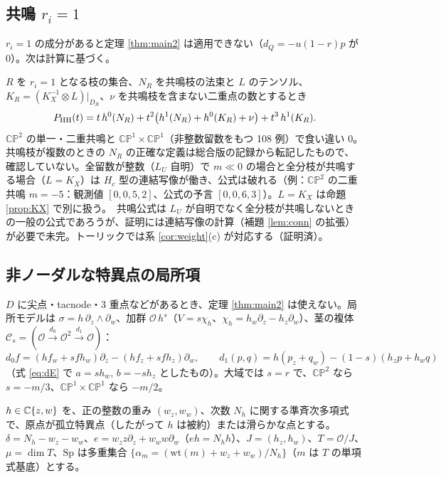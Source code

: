 \subsection{共鳴 $r_i=1$}
$r_i=1$ の成分があると定理 \ref{thm:main2} は適用できない（$d_Q=-u(1-r)p$ が 0）。次は計算に基づく。
\begin{obs}\label{obs:res}
$R$ を $r_i=1$ となる枝の集合、$N_R$ を共鳴枝の法束と $L$ のテンソル、$K_R=(K_X^{-1}\otimes L)|_{D_R}$、$\nu$ を共鳴枝を含まない二重点の数とするとき
\[P_{\mathrm{HH}}(t)=t\,h^0(N_R)+t^2\bigl(h^1(N_R)+h^0(K_R)+\nu\bigr)+t^3\,h^1(K_R).\]
$\mathbb{CP}^2$ の単一・二重共鳴と $\mathbb{CP}^1\times\mathbb{CP}^1$（非整数留数をもつ 108 例）で食い違い 0。共鳴枝が複数のときの $N_R$ の正確な定義は総合版の記録から転記したもので、確認していない\tQ。全留数が整数（$L_U$ 自明）で $m\ll0$ の場合と全分枝が共鳴する場合（$L=K_X$）は $H_c$ 型の連結写像が働き、公式は破れる（例：$\mathbb{CP}^2$ の二重共鳴 $m=-5$：観測値 $[0,0,5,2]$、公式の予言 $[0,0,6,3]$）。$L=K_X$ は命題 \ref{prop:KX} で別に扱う。\tK\ 共鳴公式は $L_U$ が自明でなく全分枝が共鳴しないときの一般の公式であろうが、証明には連結写像の計算（補題 \ref{lem:conn} の拡張）が必要で未完。トーリックでは系 \ref{cor:weight}(c) が対応する（証明済\tP）。
\end{obs}

\subsection{非ノーダルな特異点の局所項}\label{subsec:local}
$D$ に尖点・tacnode・3 重点などがあるとき、定理 \ref{thm:main2} は使えない。局所モデルは $\sigma=h\,\partial_z\wedge\partial_w$、加群 $\mathcal O\,h^s$（$V=s\chi_h$、$\chi_h=h_w\partial_z-h_z\partial_w$）、茎の複体 $\mathcal C_s=(\mathcal O\xrightarrow{d_0}\mathcal O^2\xrightarrow{d_1}\mathcal O)$：
\[d_0f=(hf_w+sfh_w)\partial_z-(hf_z+sfh_z)\partial_w,\qquad d_1(p,q)=h(p_z+q_w)-(1-s)(h_zp+h_wq)\]
（式 \eqref{eq:dE} で $a=sh_w$, $b=-sh_z$ としたもの）。大域では $s=r$ で、$\mathbb{CP}^2$ なら $s=-m/3$、$\mathbb{CP}^1\times\mathbb{CP}^1$ なら $-m/2$。

$h\in\mathbb C\{z,w\}$ を、正の整数の重み $(w_z,w_w)$、次数 $N_h$ に関する準斉次多項式で、原点が孤立特異点（したがって $h$ は被約）または滑らかな点とする。$\delta=N_h-w_z-w_w$、$e=w_zz\partial_z+w_ww\partial_w$（$eh=N_hh$）、$J=(h_z,h_w)$、$T=\mathcal O/J$、$\mu=\dim T$、$\mathrm{Sp}$ は多重集合 $\{\alpha_m=(\mathrm{wt}(m)+w_z+w_w)/N_h\}$（$m$ は $T$ の単項式基底）とする。

